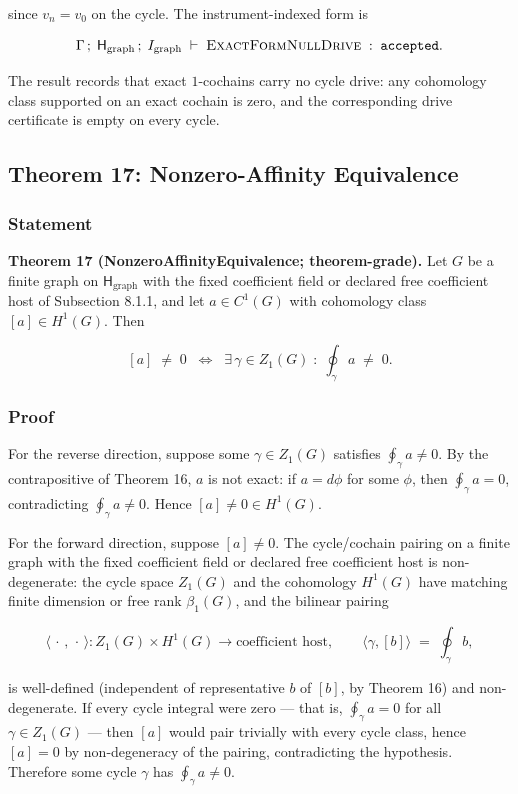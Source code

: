 \documentclass[11pt]{article}
\theoremstyle{definition}
\begin{document}
since \(v_n=v_0\) on the cycle. The instrument-indexed form is

\[
\Gamma\,;\;\mathsf H_{\mathrm{graph}}\,;\;I_{\mathrm{graph}}\;\vdash\;\textsc{ExactFormNullDrive}\;:\;\texttt{accepted}.
\]

The result records that exact \(1\)-cochains carry no cycle drive: any cohomology class supported on an exact cochain is zero, and the corresponding drive certificate is empty on every cycle.

\subsection{Theorem 17: Nonzero-Affinity Equivalence}

\subsubsection{Statement}

\textbf{Theorem 17 (NonzeroAffinityEquivalence; theorem-grade).} Let \(G\) be a finite graph on \(\mathsf H_{\mathrm{graph}}\) with the fixed coefficient field or declared free coefficient host of Subsection 8.1.1, and let \(a\in C^1(G)\) with cohomology class \([a]\in H^1(G)\). Then

\[
[a]\;\neq\;0\;\;\Longleftrightarrow\;\;\exists\,\gamma\in Z_1(G)\;:\;\oint_\gamma a\;\neq\;0.
\]

\subsubsection{Proof}

For the reverse direction, suppose some \(\gamma\in Z_1(G)\) satisfies \(\oint_\gamma a\neq 0\). By the contrapositive of Theorem 16, \(a\) is not exact: if \(a=d\phi\) for some \(\phi\), then \(\oint_\gamma a=0\), contradicting \(\oint_\gamma a\neq 0\). Hence \([a]\neq 0\in H^1(G)\).

For the forward direction, suppose \([a]\neq 0\). The cycle/cochain pairing on a finite graph with the fixed coefficient field or declared free coefficient host is non-degenerate: the cycle space \(Z_1(G)\) and the cohomology \(H^1(G)\) have matching finite dimension or free rank \(\beta_1(G)\), and the bilinear pairing

\[
\langle\,\cdot\,,\,\cdot\,\rangle\colon Z_1(G)\times H^1(G)\to\text{coefficient host},\qquad \langle\gamma,[b]\rangle\;=\;\oint_\gamma b,
\]

is well-defined (independent of representative \(b\) of \([b]\), by Theorem 16) and non-degenerate. If every cycle integral were zero --- that is, \(\oint_\gamma a=0\) for all \(\gamma\in Z_1(G)\) --- then \([a]\) would pair trivially with every cycle class, hence \([a]=0\) by non-degeneracy of the pairing, contradicting the hypothesis. Therefore some cycle \(\gamma\) has \(\oint_\gamma a\neq 0\).
\end{document}
